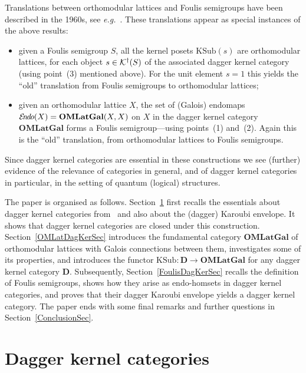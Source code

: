 \documentclass{article}
\newcommand{\cat}[1]{\ensuremath{\mathbf{#1}}}
\newcommand{\Cat}[1]{\ensuremath{\mathbf{#1}}}
\newcommand{\KSub}{\ensuremath{\mathrm{KSub}}}
\newcommand{\dagKaroubi}[1]{{\cal K}^{\dag}(#1)}
\newcommand{\EndoHom}[1]{{\cal E}{\kern-.5ex}\textit{n}{\kern-.2ex}\textit{d}{\kern-.2ex}\textit{o}(#1)}
\begin{document}
Translations between orthomodular lattices and Foulis semigroups have
been described in the 1960s, see
\textit{e.g.}~\cite{Foulis60,Foulis62,Foulis63,BlythJ72,Kalmbach83}. These
translations appear as special instances of the above results:
\begin{itemize}
\item given a Foulis semigroup $S$, all the kernel posets $\KSub(s)$
  are orthomodular lattices, for each object $s\in\dagKaroubi{S}$ of
  the associated dagger kernel category (using point~(3) mentioned
  above). For the unit element $s=1$ this yields the ``old''
  translation from Foulis semigroups to orthomodular lattices;

\item given an orthomodular lattice $X$, the set of (Galois) endomaps
  $\EndoHom{X} = \Cat{OMLatGal}(X, X)$ on $X$ in the dagger kernel
  category \Cat{OMLatGal} forms a Foulis semigroup---using points~(1)
  and~(2). Again this is the ``old'' translation, from orthomodular
  lattices to Foulis semigroups.
\end{itemize}

\noindent Since dagger kernel categories are essential in these
constructions we see (further) evidence of the relevance of categories
in general, and of dagger kernel categories in particular, in the
setting of quantum (logical) structures.

The paper is organised as follows. Section~\ref{DagKerSec} first
recalls the essentials about dagger kernel categories
from~\cite{HeunenJ09a} and also about the (dagger) Karoubi envelope.
It shows that dagger kernel categories are closed under this
construction. Section~\ref{OMLatDagKerSec} introduces the fundamental
category \Cat{OMLatGal} of orthomodular lattices with Galois
connections between them, investigates some of its properties, and
introduces the functor $\KSub\colon \cat{D}\rightarrow \Cat{OMLatGal}$
for any dagger kernel category \Cat{D}. Subsequently,
Section~\ref{FoulisDagKerSec} recalls the definition of Foulis semigroups,
shows how they arise as endo-homsets in dagger kernel categories,
and proves that their dagger Karoubi envelope yields a dagger
kernel category. The paper ends with some final remarks and further
questions in Section~\ref{ConclusionSec}.


\section{Dagger kernel categories}\label{DagKerSec}
\end{document}
